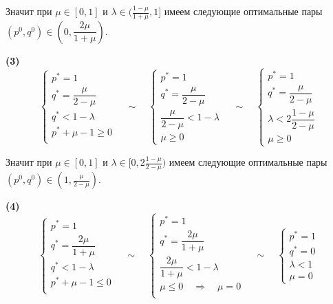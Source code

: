 Значит при $\mu \in [0, 1]$ и $\lambda \in (\frac{1-\mu}{1+\mu}, 1]$
имеем следующие оптимальные пары
$(p^0, q^0) \in (0, \dfrac{2\mu}{1 + \mu})$.

\hspace{5mm}

\textbf{(3)}
$$
	\begin{cases}
		p^* = 1 \\
		q^* = \dfrac{\mu}{2-\mu} \\
		q^* < 1 - \lambda \\
		p^* + \mu - 1 \geqslant 0 \\
	\end{cases}
	\quad \sim \quad
	\begin{cases}
		p^* = 1 \\
		q^* = \dfrac{\mu}{2-\mu} \\
		\dfrac{\mu}{2-\mu} < 1 - \lambda \\
		\mu \geqslant 0
	\end{cases}
	\quad \sim \quad
	\begin{cases}
		p^* = 1 \\
		q^* = \dfrac{\mu}{2-\mu} \\
		\lambda < 2\dfrac{1-\mu}{2-\mu} \\
		\mu \geqslant 0
	\end{cases}
$$

Значит при $\mu \in [0, 1]$ и $\lambda \in [0, 2\frac{1-\mu}{2-\mu})$
имеем следующие оптимальные пары
$ (p^0, q^0) \in (1, \frac{\mu}{2 - \mu})$.

\hspace{5mm}

\textbf{(4)}
$$
	\begin{cases}
		p^* = 1 \\
		q^* = \dfrac{2\mu}{1+\mu} \\
		q^* < 1 - \lambda \\
		p^* + \mu - 1 \leqslant 0 \\
	\end{cases}
	\quad \sim \quad
	\begin{cases}
		p^* = 1 \\
		q^* = \dfrac{2\mu}{1+\mu} \\
		\dfrac{2\mu}{1+\mu} < 1 - \lambda \\
		\mu \leqslant 0 \quad \Rightarrow \quad \mu = 0 \\
	\end{cases}
	\quad \sim \quad
	\begin{cases}
		p^* = 1 \\
		q^* = 0 \\
		\lambda < 1 \\
		\mu = 0
	\end{cases}
$$

